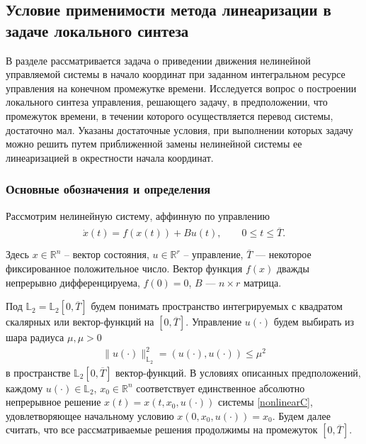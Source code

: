 \documentclass[../main.tex]{subfiles}
\begin{document}
\newpage
\subsection{Условие применимости метода линеаризации в задаче локального синтеза} 
В  разделе рассматривается задача о  приведении движения нелинейной управляемой системы в начало координат при заданном интегральном ресурсе управления на конечном промежутке времени. Исследуется вопрос о  построении локального синтеза управления, решающего задачу, в предположении, что промежуток времени, в течении которого осуществляется перевод системы, достаточно мал. Указаны достаточные условия, при выполнении которых задачу можно решить путем приближенной замены нелинейной системы ее линеаризацией в окрестности начала координат.
\subsubsection{Основные обозначения и определения}
Рассмотрим нелинейную систему, аффинную по управлению
\begin{gather}\label{nonlinearC}
	\begin{gathered}
		\dot{x}(t)=f(x(t))+B u(t), \qquad 0 \leqslant t \leqslant   \overline{T}. \\
	\end{gathered}
\end{gather}
Здесь $ x \in \mathbb{R}^n $ -- вектор состояния, $ u \in \mathbb{R}^r $ -- управление,  $ \overline{
T} $ --- некоторое фиксированное положительное число. Вектор функция $f(x)$ дважды непрерывно дифференцируема, $f(0)=0$, $B$ --- $n \times r$ матрица.


Под $ \mathbb{L}_2 = \mathbb{L}_2[0,\overline{T}]  $ будем понимать  пространство интегрируемых с квадратом скалярных или вектор-функций  на $ [0,\overline{T}] $. 
 Управление $ u(\cdot) $ будем выбирать из шара радиуса $ \mu, \mu > 0 $
\begin{gather}\label{constrC}
	\lVert u(\cdot)\rVert^2_{\mathbb{L}_2} = \left(u(\cdot),u(\cdot) \right) \leqslant \mu^2
\end{gather}
в пространстве $\mathbb{L}_2[0,\overline{T}]$ вектор-функций.
В условиях описанных предположений, каждому $ u(\cdot) \in \mathbb{L}_2 $, $x_0 \in  \mathbb{R}^n  $ соответствует единственное абсолютно непрерывное решение $ x(t)=x(t,x_0, u(\cdot)) $ системы \eqref{nonlinearC}, удовлетворяющее начальному условию  $ x(0,x_0, u(\cdot)) = x_0$. Будем далее считать, что все рассматриваемые решения продолжимы  на промежуток $[0,\overline{T}]$.  
\end{document}
